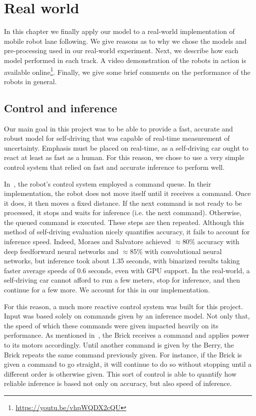 
\chapter{Real world}\label{chp:realworld}

In this chapter we finally apply our model to a real-world implementation of mobile robot lane
following. We give reasons as to why we chose the models and pre-processing used in our real-world
experiment. Next, we describe how each model performed in each track. A video demonstration of the
robots in action is available online\footnote{\url{https://youtu.be/vhpWQDX2cQU}}. Finally, we give
some brief comments on the performance of the robots in general.

\section{Control and inference}

Our main goal in this project was to be able to provide a fast, accurate and robust model for
self-driving that was capable of real-time measurement of uncertainty. Emphasis must be placed on
real-time, as a self-driving car ought to react at least as fast as a human. For this reason, we
chose to use a very simple control system that relied on fast and accurate inference to perform
well.

In~\cite{self-driving}, the robot's control system employed a command queue. In their
implementation, the robot does not move itself until it receives a command. Once it does, it then
moves a fixed distance. If the next command is not ready to be processed, it stops and waits
for inference (i.e. the next command). Otherwise, the queued command is executed. These steps are
then repeated. Although this method of self-driving evaluation nicely quantifies accuracy, it fails
to account for inference speed.  Indeed, Moraes and Salvatore achieved $\approx$80\% accuracy with
deep feedforward neural networks and $\approx$85\% with convolutional neural networks, but
inference took about 1.35 seconds, with binarized results taking faster average speeds of 0.6
seconds, even with GPU support. In the real-world, a self-driving car cannot afford to run a few
meters, stop for inference, and then continue for a few more. We account for this in our
implementation.

For this reason, a much more reactive control system was built for this project. Input was based
solely on commands given by an inference model. Not only that, the speed of which these commands
were given impacted heavily on its performance. As mentioned in~, the Brick
receives a command and applies power to its motors accordingly. Until another command is given by
the Berry, the Brick repeats the same command previously given. For instance, if the Brick is given
a command to go straight, it will continue to do so without stopping until a different order is
otherwise given. This sort of control is able to quantify how reliable inference is based not only
on accuracy, but also speed of inference.

